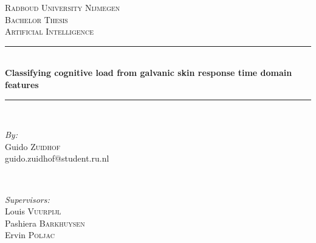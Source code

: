 \documentclass[11pt,leqno,a4paper]{report} %
\begin{document}
\begin{titlepage}

\newcommand{\HRule}{\rule{\linewidth}{0.5mm}} %

\center %
 

\textsc{\LARGE Radboud University Nijmegen}\\[1.5cm] %
\textsc{\Large Bachelor Thesis}\\[0.5cm] %
\textsc{\large Artificial Intelligence}\\[0.5cm] %


\HRule \\[0.4cm]
{ \huge \bfseries Classifying cognitive load from galvanic skin response time domain features}\\[0.4cm] %
\HRule \\[1.5cm]
 

\begin{minipage}{0.4\textwidth}
\begin{flushleft} \large
\emph{By:}\\
Guido \textsc{Zuidhof} %
\\\small{guido.zuidhof@student.ru.nl}
\end{flushleft}
\end{minipage}
~
\begin{minipage}{0.4\textwidth}
\begin{flushright} \large
\emph{Supervisors:} \\
Louis \textsc{Vuurpijl}\\ 
Pashiera \textsc{Barkhuysen}\\
Ervin \textsc{Poljac}
\end{flushright}
\end{minipage}\\[4cm]


\end{titlepage}
\end{document}
